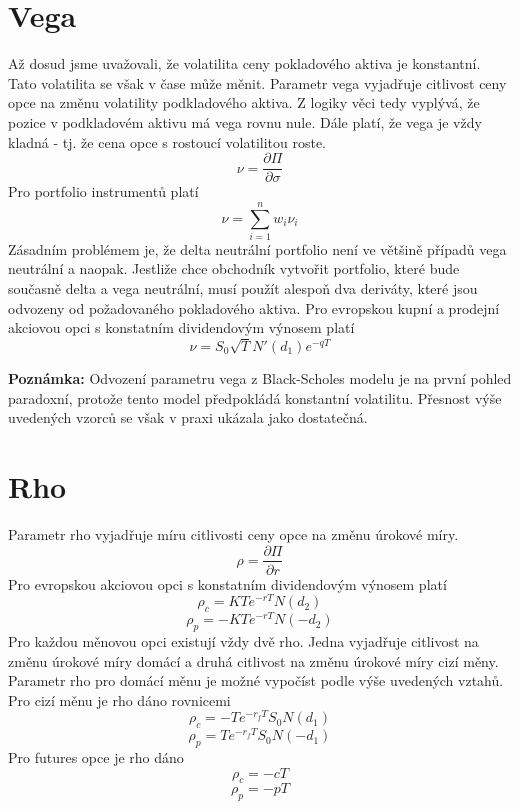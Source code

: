 \documentclass[a4paper]{book}
\begin{document}
\section{Vega}
Až dosud jsme uvažovali, že volatilita ceny pokladového aktiva je konstantní. Tato volatilita se však v čase může měnit. Parametr vega vyjadřuje citlivost ceny opce na změnu volatility podkladového aktiva. Z logiky věci tedy vyplývá, že pozice v podkladovém aktivu má vega rovnu nule. Dále platí, že vega je vždy kladná - tj. že cena opce s rostoucí volatilitou roste.
\begin{equation*}
\nu = \frac{\partial \Pi}{\partial \sigma}
\end{equation*}
Pro portfolio instrumentů platí
\begin{equation*}
\nu = \sum_{i=1}^{n} w_i \nu_i
\end{equation*}
Zásadním problémem je, že delta neutrální portfolio není ve většině případů vega neutrální a naopak. Jestliže chce obchodník vytvořit portfolio, které bude současně delta a vega neutrální, musí použít alespoň dva deriváty, které jsou odvozeny od požadovaného pokladového aktiva.
Pro evropskou kupní a prodejní akciovou opci s konstatním dividendovým výnosem platí
\begin{equation*}
\nu = S_0 \sqrt{T}N'(d_1)e^{-qT}
\end{equation*}

\noindent \textbf{Poznámka:} Odvození parametru vega z Black-Scholes modelu je na první pohled paradoxní, protože tento model předpokládá konstantní volatilitu. Přesnost výše uvedených vzorců se však v praxi ukázala jako dostatečná.

\section{Rho}
Parametr rho vyjadřuje míru citlivosti ceny opce na změnu úrokové míry.
\begin{equation*}
\rho = \frac{\partial \Pi}{\partial  r}
\end{equation*}
Pro evropskou akciovou opci s konstatním dividendovým výnosem platí
\begin{equation*}
\rho_c = KTe^{-rT}N(d_2)
\end{equation*}
\begin{equation*}
\rho_p = -KTe^{-rT}N(-d_2)
\end{equation*}
Pro každou měnovou opci existují vždy dvě rho. Jedna vyjadřuje citlivost na změnu úrokové míry domácí a druhá citlivost na změnu úrokové míry cizí měny. Parametr rho pro domácí měnu je možné vypočíst podle výše uvedených vztahů. Pro cizí měnu je rho dáno rovnicemi
\begin{equation*}
\rho_c = -Te^{-r_fT}S_0N(d_1)
\end{equation*}
\begin{equation*}
\rho_p = Te^{-r_fT}S_0N(-d_1)
\end{equation*}
Pro futures opce je rho dáno
\begin{equation*}
\rho_c = -cT
\end{equation*}
\begin{equation*}
\rho_p = -pT
\end{equation*}
\end{document}
